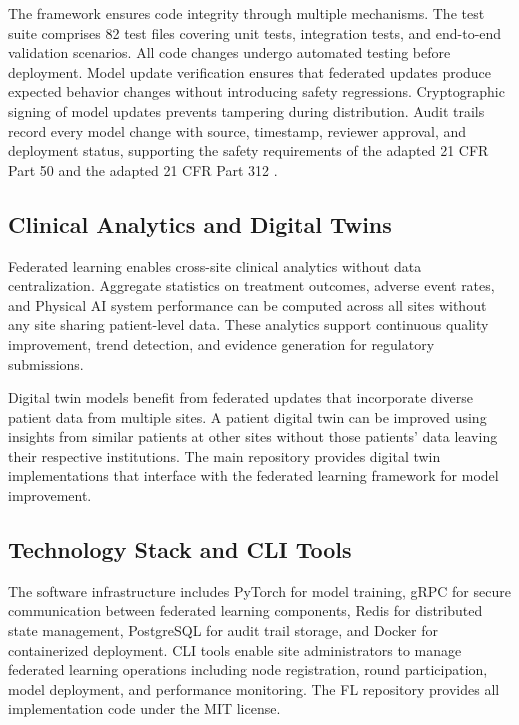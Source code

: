 The framework ensures code integrity through multiple mechanisms. The test
suite comprises 82 test files covering unit tests, integration tests, and
end-to-end validation scenarios. All code changes undergo automated testing
before deployment. Model update verification ensures that federated updates
produce expected behavior changes without introducing safety regressions.
Cryptographic signing of model updates prevents tampering during distribution.
Audit trails record every model change with source, timestamp, reviewer
approval, and deployment status, supporting the safety requirements of the
adapted 21 CFR Part 50 \cite{cfr50-adapt} and the adapted 21 CFR Part 312
\cite{cfr312-adapt}.

\subsection{Clinical Analytics and Digital Twins}
\label{subsec:fl-analytics}

Federated learning enables cross-site clinical analytics without data
centralization. Aggregate statistics on treatment outcomes, adverse event
rates, and Physical AI system performance can be computed across all sites
without any site sharing patient-level data. These analytics support continuous
quality improvement, trend detection, and evidence generation for regulatory
submissions.

Digital twin models benefit from federated updates that incorporate diverse
patient data from multiple sites. A patient digital twin can be improved using
insights from similar patients at other sites without those patients' data
leaving their respective institutions. The main repository \cite{main-repo}
provides digital twin implementations that interface with the federated
learning framework for model improvement.

\subsection{Technology Stack and CLI Tools}
\label{subsec:fl-tech-stack}

The software infrastructure includes PyTorch for model training, gRPC for
secure communication between federated learning components, Redis for
distributed state management, PostgreSQL for audit trail storage, and Docker
for containerized deployment. CLI tools enable site administrators to manage
federated learning operations including node registration, round participation,
model deployment, and performance monitoring. The FL repository \cite{fl-repo}
provides all implementation code under the MIT license.

